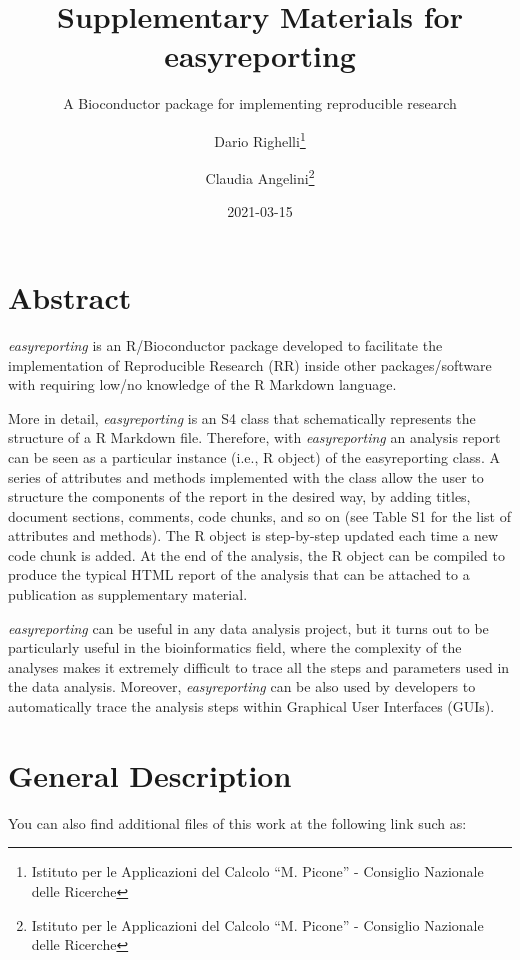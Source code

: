 \documentclass[
]{article}
\title{Supplementary Materials for easyreporting}
\subtitle{A Bioconductor package for implementing reproducible research}
\author{Dario Righelli\footnote{Istituto per le Applicazioni del Calcolo
  ``M. Picone'' - Consiglio Nazionale delle Ricerche} \and Claudia
Angelini\footnote{Istituto per le Applicazioni del Calcolo ``M. Picone''
  - Consiglio Nazionale delle Ricerche}}
\date{2021-03-15}
\begin{document}
\maketitle

\newcommand{\beginsupplement}{%
        \setcounter{table}{0}
        \renewcommand{\thetable}{S\arabic{table}}%
        \setcounter{figure}{0}
        \renewcommand{\thefigure}{S\arabic{figure}}%
     }

\hypertarget{abstract}{%
\section{Abstract}\label{abstract}}

\emph{easyreporting} is an R/Bioconductor package developed to
facilitate the implementation of Reproducible Research (RR) inside other
packages/software with requiring low/no knowledge of the R Markdown
language.

More in detail, \emph{easyreporting} is an S4 class that schematically
represents the structure of a R Markdown file. Therefore, with
\emph{easyreporting} an analysis report can be seen as a particular
instance (i.e., R object) of the easyreporting class. A series of
attributes and methods implemented with the class allow the user to
structure the components of the report in the desired way, by adding
titles, document sections, comments, code chunks, and so on (see Table
S1 for the list of attributes and methods). The R object is step-by-step
updated each time a new code chunk is added. At the end of the analysis,
the R object can be compiled to produce the typical HTML report of the
analysis that can be attached to a publication as supplementary
material.

\emph{easyreporting} can be useful in any data analysis project, but it
turns out to be particularly useful in the bioinformatics field, where
the complexity of the analyses makes it extremely difficult to trace all
the steps and parameters used in the data analysis. Moreover,
\emph{easyreporting} can be also used by developers to automatically
trace the analysis steps within Graphical User Interfaces (GUIs).

\hypertarget{general-description}{%
\section{General Description}\label{general-description}}

You can also find additional files of this work at the following link
such as:
\end{document}

